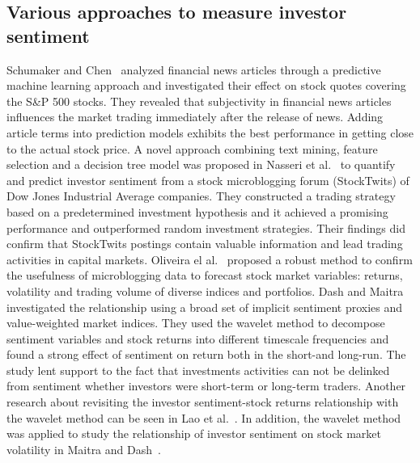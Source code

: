 \documentclass[review,3p,times,12pt,number]{elsarticle}
\begin{document}
\subsection{Various approaches to measure investor sentiment}
Schumaker and Chen~\cite{schumaker2009textual} analyzed financial news articles through a predictive machine learning approach and investigated their effect on stock quotes covering the S\&P 500 stocks. They revealed that subjectivity in financial news articles influences the market trading immediately after the release of news. Adding article terms into prediction models exhibits the best performance in getting close to the actual stock price.
A novel approach combining text mining, feature selection and a decision tree model was proposed in Nasseri et al.~\cite{Nasseri2015Quantifying} to quantify and predict investor sentiment from a stock microblogging forum (StockTwits) of Dow Jones Industrial Average companies. They constructed a trading strategy based on a predetermined investment hypothesis and it achieved a promising performance and outperformed random investment strategies. Their findings did confirm that StockTwits postings contain valuable information and lead trading activities in capital markets.
Oliveira el al.~\cite{Oliveira2017The} proposed a robust method to confirm the usefulness of microblogging data to forecast stock market variables: returns, volatility and trading volume of diverse indices and portfolios.
Dash and Maitra~\cite{Dash2017Does} investigated the relationship using a broad set of implicit sentiment proxies and value-weighted market indices. They used the wavelet method to decompose sentiment variables and stock returns into different timescale frequencies and found a strong effect of sentiment on return both in the short-and long-run. The study lent support to the fact that investments activities can not be delinked from sentiment whether investors were short-term or long-term traders. Another research about revisiting the investor sentiment-stock returns relationship with the wavelet method can be seen in Lao et al.~\cite{Lao2018Revisiting}.
In addition, the wavelet method was applied to study the relationship of investor sentiment on stock market volatility in Maitra and Dash~\cite{Maitra2017Sentiment}.
\end{document}
